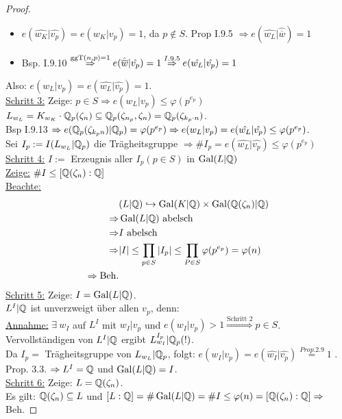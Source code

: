 \begin{proof}
\begin{itemize}
\item $e(\hat{w_K} | \hat{v_p}) = e(w_K|v_p)=1$, da $p \not \in S$. Prop I.9.5 $\Rightarrow e(\hat{w_L} | \hat{\overline{w}})=1$
\item Bsp. I.9.10 $\stackrel{\operatorname{ggT}(n,p)=1}{\Rightarrow} e(\hat{\overline{w}}| \hat{v_p})=1 \stackrel{I.9.5}{\Rightarrow} e(\hat{w_L} | \hat{v_p})=1$
\end{itemize}
Also: $e(w_L|v_p)=e(\hat{w_L} | \hat{v_p})=1$.\\
\underline{Schritt 3:} Zeige: $p \in S \Rightarrow e(w_L|v_p) \leq \varphi(p^{e_p})$\\
$L_{w_L} = K_{w_K} \cdot \mathbb{Q}_p(\zeta_n) \subseteq \mathbb{Q}_p(\zeta_{n_p}, \zeta_n)=\mathbb{Q}_p(\zeta_{k_p \cdot n})$.\\
Bsp I.9.13 $\Rightarrow e(\mathbb{Q}_p(\zeta_{k_p n} ) | \mathbb{Q}_p)=\varphi(p^{e_p}) \Rightarrow e(w_L|v_p)=e(\hat{w_L} | \hat{v_p}) \leq \varphi(p^{e_p})$.\\
Sei $I_p:=I(L_{w_L} | \mathbb{Q}_p)$ die Trägheitsgruppe $\Rightarrow \#I_p = e(\hat{w_L} | \hat{v_p}) \leq \varphi(p^{e_p})$\\
\underline{Schritt 4:} $I:=$ Erzeugnis aller $I_p (p \in S)$ in $\operatorname{Gal}(L|\mathbb{Q})$\\
\underline{Zeige:} $\# I \leq [\mathbb{Q}(\zeta_n):\mathbb{Q}]$\\
\underline{Beachte:} \begin{align*}
&(L|\mathbb{Q}) \hookrightarrow \operatorname{Gal}(K|\mathbb{Q})\times \operatorname{Gal}(\mathbb{Q}(\zeta_n)|\mathbb{Q})\\
\Rightarrow &\operatorname{Gal}(L|\mathbb{Q}) \text{ abelsch}\\
\Rightarrow &I \text{ abelsch }\\
\Rightarrow &|I| \leq \prod_{p \in S} |I_p| \leq \prod_{P \in S} \varphi(p^{e_p})=\varphi(n)\\
\Rightarrow \text{Beh.}&
\end{align*}
\underline{Schritt 5:} Zeige: $I=\operatorname{Gal}(L|\mathbb{Q})$.\\
$L^I|\mathbb{Q}$ ist unverzweigt über allen $v_p$, denn:\\
\underline{Annahme:} $\exists \ w_I$ auf $L^I$ mit $w_I | v_p$ und $e(w_I|v_p)>1 \stackrel{\text{Schritt 2}}{\Rightarrow} p \in S$.\\
Vervollständigen von $L^I | \mathbb{Q}$ ergibt $L_{w_I}^{I_p} | \mathbb{Q}_p (!)$.\\
Da $I_p=$ Trägheitsgruppe von $L_{w_L}|\mathbb{Q}_p$, folgt: $e(w_I|v_p)=e(\hat{w_I} | \hat{v_p})\stackrel{Prop. 2.9}{=} 1$ \Lightning.\\
Prop. 3.3. $\Rightarrow L^I=\mathbb{Q}$ und $\operatorname{Gal}(L|\mathbb{Q})=I$.\\
\underline{Schritt 6:} Zeige: $L=\mathbb{Q}(\zeta_n)$.\\
Es gilt: $\mathbb{Q}(\zeta_n) \subseteq L$ und $[L:\mathbb{Q}]=\# \operatorname{Gal}(L|\mathbb{Q})=\# I \leq \varphi(n)=[\mathbb{Q}(\zeta_n):\mathbb{Q}] \Rightarrow$ Beh.
\end{proof}

